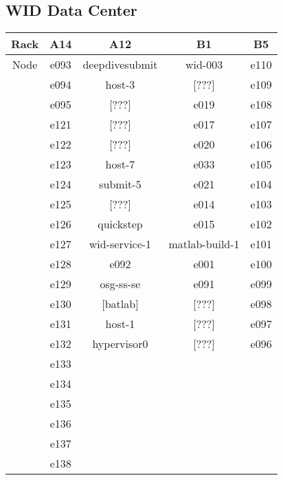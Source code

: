 \documentclass[10pt,letterpaper]{article}
\begin{document}
    \subsection{WID Data Center}
        \begin{center}
        \begin{tabular}{ |c|c|c|c|c|}
        \hline
        Rack & A14 & A12 & B1 & B5 \\
        \hline
        \multirow{1}{3em}{Node}

        & e093  & deepdivesubmit & wid-003        & e110 \\
        & e094  & host-3         & [???]          & e109 \\
        & e095  & [???]          & e019           & e108 \\
        & e121  & [???]          & e017           & e107 \\
        & e122  & [???]          & e020           & e106 \\
        & e123  & host-7         & e033           & e105 \\
        & e124  & submit-5       & e021           & e104 \\
        & e125  & [???]          & e014           & e103 \\
        & e126  & quickstep      & e015           & e102 \\
        & e127  & wid-service-1  & matlab-build-1 & e101 \\
        & e128  & e092           & e001           & e100 \\
        & e129  & osg-ss-se      & e091           & e099 \\
        & e130  & [batlab]       & [???]          & e098 \\
        & e131  & host-1         & [???]          & e097 \\
        & e132  & hypervisor0    & [???]          & e096 \\
        & e133  &                &                &      \\
        & e134  &                &                &      \\
        & e135  &                &                &      \\
        & e136  &                &                &      \\
        & e137  &                &                &      \\
        & e138  &                &                &      \\

\end{tabular}
\end{center}
\end{document}
